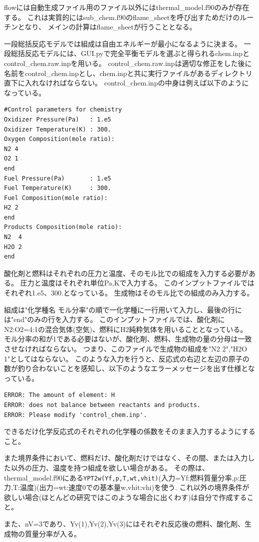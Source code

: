 \documentclass{jsarticle}
\begin{document}
flowには自動生成ファイル用のファイル以外にはthermal\_model.f90のみが存在する。
これは実質的にはsub\_chem.f90のflame\_sheetを呼び出すためだけのルーチンとなり、
メインの計算はflame\_sheetが行うこととなる。

一段総括反応モデルでは組成は自由エネルギーが最小になるように決まる。
一段総括反応モデルには、GUI.pyで完全平衡モデルを選ぶと得られるchem.inpとcontrol\_chem.raw.inpを用いる。
control\_chem.raw.inpは適切な修正をした後に名前をcontrol\_chem.inpとし、chem.inpと共に実行ファイルがあるディレクトリ直下に入れなければならない。
control\_chem.inpの中身は例えば以下のようになっている。
\begin{verbatim}
#Control parameters for chemistry
Oxidizer Pressure(Pa)   : 1.e5
Oxidizer Temperature(K) : 300.
Oxygen Composition(mole ratio):
N2 4
O2 1
end
Fuel Pressure(Pa)       : 1.e5
Fuel Temperature(K)     : 300.
Fuel Composition(mole ratio):
H2 2
end
Products Composition(mole ratio):
N2  4
H2O 2
end
\end{verbatim}
酸化剤と燃料はそれぞれの圧力と温度、そのモル比での組成を入力する必要がある。
圧力と温度はそれぞれ単位Pa,Kで入力する。
このインプットファイルではそれぞれ1.e5、300.となっている。
生成物はそのモル比での組成のみ入力する。

組成は"化学種名 モル分率"の順で一化学種に一行用いて入力し、最後の行には"end"のみの行を入力する。
このインプットファイルでは、酸化剤にN2:O2=4:1の混合気体(空気)、燃料にH2純粋気体を用いることとなっている。
モル分率の和が1である必要はないが、酸化剤、燃料、生成物の量の分母は一致させなければならない。
つまり、このファイルで生成物の組成を"N2 2","H2O 1"としてはならない。
このような入力を行うと、反応式の右辺と左辺の原子の数が釣り合わないことを感知し、以下のようなエラーメッセージを出す仕様となっている。
\begin{verbatim}
ERROR: The amount of element: H
ERROR: does not balance between reactants and products.
ERROR: Please modify 'control_chem.inp'.
\end{verbatim}
できるだけ化学反応式のそれぞれの化学種の係数をそのまま入力するようにすること。

また境界条件において、燃料だけ、酸化剤だけではなく、その間、または入力した以外の圧力、温度を持つ組成を欲しい場合がある。
その際は、thermal\_model.f90にある\verb|YPT2w(Yf,p,T,wt,vhit)|(入力=Yf:燃料質量分率,p:圧力,T:温度)(出力=wt:速度0での基本量w,vhit:vhi)を使う.
これ以外の境界条件が欲しい場合(ほとんどの研究ではこのような場合に出くわす)は自分で作成すること。

また、nV=3であり、Yv(1),Yv(2),Yv(3)にはそれぞれ反応後の燃料、酸化剤、生成物の質量分率が入る。
\end{document}
